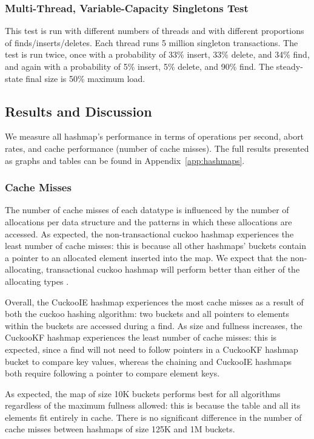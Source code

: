\subsubsection{Multi-Thread, Variable-Capacity Singletons Test} 
This test is run with different numbers of threads and with different proportions of finds/inserts/deletes. Each thread runs 5 million singleton transactions.
The test is run twice, once with a probability of 33\% insert, 33\% delete, and 34\% find, and again with a probability of 5\% insert, 5\% delete, and 90\% find. The steady-state final size is 50\% maximum load.

\subsection{Results and Discussion}

We measure all hashmap's performance in terms of operations per second, abort rates, and cache performance (number of cache misses). The full results presented as graphs and tables can be found in Appendix~\ref{app:hashmaps}.

\subsubsection{Cache Misses}

The number of cache misses of each datatype is influenced by the number of allocations per data structure and the patterns in which these allocations are accessed. As expected, the non-transactional cuckoo hashmap experiences the least number of cache misses: this is because all other hashmaps' buckets contain a pointer to an allocated element inserted into the map. We expect that the non-allocating, transactional cuckoo hashmap will perform better than either of the allocating types .

Overall, the CuckooIE hashmap experiences the most cache misses as a result of both the cuckoo hashing algorithm: two buckets and all pointers to elements within the buckets are accessed during a find. As size and fullness increases, the CuckooKF hashmap experiences the least number of cache misses: this is expected, since a find will not need to follow pointers in a CuckooKF hashmap bucket to compare key values, whereas the chaining and CuckooIE hashmaps both require following a pointer to compare element keys.

As expected, the map of size 10K buckets performs best for all algorithms regardless of the maximum fullness allowed: this is because the table and all its elements fit entirely in cache.
There is no significant difference in the number of cache misses between hashmaps of size 125K and 1M buckets. 

